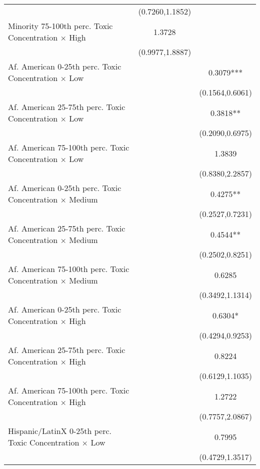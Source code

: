 \begin{table}[H]
\begin{threeparttable}
\begin{tabular}{@{\extracolsep{5pt}}lcc}
                    &(0.7260,1.1852)   &               \\
Minority 75-100th perc. Toxic Concentration $\times$ High&      1.3728   &               \\
                    &(0.9977,1.8887)   &               \\
Af. American 0-25th perc. Toxic Concentration $\times$ Low&               &      0.3079***\\
                    &               &(0.1564,0.6061)   \\
Af. American 25-75th perc. Toxic Concentration $\times$ Low&               &      0.3818** \\
                    &               &(0.2090,0.6975)   \\
Af. American 75-100th perc. Toxic Concentration $\times$ Low&               &      1.3839   \\
                    &               &(0.8380,2.2857)   \\
Af. American 0-25th perc. Toxic Concentration $\times$ Medium&               &      0.4275** \\
                    &               &(0.2527,0.7231)   \\
Af. American 25-75th perc. Toxic Concentration $\times$ Medium&               &      0.4544** \\
                    &               &(0.2502,0.8251)   \\
Af. American 75-100th perc. Toxic Concentration $\times$ Medium&               &      0.6285   \\
                    &               &(0.3492,1.1314)   \\
Af. American 0-25th perc. Toxic Concentration  $\times$ High&               &      0.6304*  \\
                    &               &(0.4294,0.9253)   \\
Af. American 25-75th perc. Toxic Concentration  $\times$ High&               &      0.8224   \\
                    &               &(0.6129,1.1035)   \\
Af. American 75-100th perc. Toxic Concentration  $\times$ High&               &      1.2722   \\
                    &               &(0.7757,2.0867)   \\
Hispanic/LatinX 0-25th perc. Toxic Concentration $\times$ Low&               &      0.7995   \\
                    &               &(0.4729,1.3517)   \\

\end{tabular}
\end{threeparttable}
\end{table}

